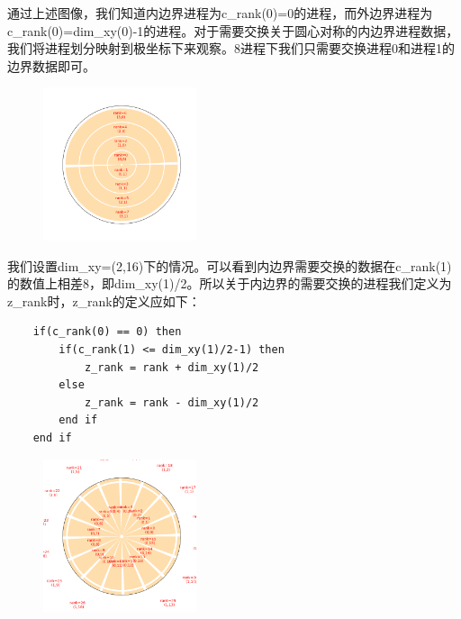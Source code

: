 \documentclass[11pt,a4paper]{article}
\begin{document}
通过上述图像，我们知道内边界进程为c_rank(0)=0的进程，而外边界进程为c_rank(0)=dim_xy(0)-1的进程。对于需要交换关于圆心对称的内边界进程数据，我们将进程划分映射到极坐标下来观察。8进程下我们只需要交换进程0和进程1的边界数据即可。
\begin{figure}[H]
	\centering
	\includegraphics[width=0.4\textwidth]{./np8-p.png}
	\caption{}
\end{figure}
我们设置dim_xy=(2,16)下的情况。可以看到内边界需要交换的数据在c_rank(1)的数值上相差8，即dim_xy(1)/2。所以关于内边界的需要交换的进程我们定义为z_rank时，z_rank的定义应如下：
\begin{lstlisting}
    if(c_rank(0) == 0) then
		if(c_rank(1) <= dim_xy(1)/2-1) then
			z_rank = rank + dim_xy(1)/2
		else
			z_rank = rank - dim_xy(1)/2
		end if
	end if
\end{lstlisting}
\begin{figure}[H]
	\centering
	\includegraphics[width=0.4\textwidth]{./np32-p.png}
	\caption{}
\end{figure}
\end{document}
